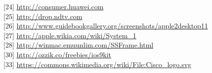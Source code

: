 [24] \href{http://consumer.huawei.com/minisite/worldwide/nexus6p/assets/nexus/images/nexus-intro-phone-1.png}
{http://consumer.huawei.com} \\

[25] \href{http://drop.ndtv.com/TECH/product_database/images/2182016105729AM_635_meizu_pro_5_ubuntu_edition.jpeg}
{http://drop.ndtv.com} \\

[26] \href{http://www.guidebookgallery.org/screenshots/apple2desktop11}
{http://www.guidebookgallery.org/screenshots/apple2desktop11} \\

[27] \href{http://apple.wikia.com/wiki/System_1}
{http://apple.wikia.com/wiki/System\_1} \\

[28] \href{http://winmac.emuunlim.com/SSFrame.html}
{http://winmac.emuunlim.com/SSFrame.html} \\

[30] \href{http://ozzik.co/freebies/ios9kit}
{http://ozzik.co/freebies/ios9kit} \\

[33] \href{https://commons.wikimedia.org/wiki/File:Cisco_logo.svg}
{https://commons.wikimedia.org/wiki/File:Cisco\_logo.svg} \\
